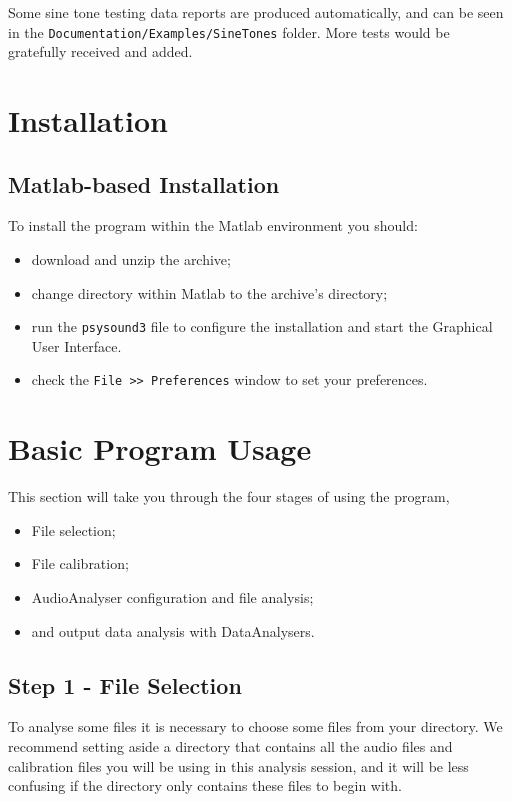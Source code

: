 \documentclass{article}
\begin{document}
Some sine tone testing data reports are produced automatically, and can be seen in the \texttt{Documentation/Examples/SineTones} folder. More tests would be gratefully received and added.

\section{Installation}

\subsection{Matlab-based Installation}
To install the program within the Matlab environment you should: 

\begin{itemize} 
	\item download and unzip the archive; 
	\item change directory within Matlab to the archive's directory;
	\item run the \texttt{psysound3} file to configure the installation and start the Graphical User Interface.
	\item check the \texttt{File >> Preferences} window to set your preferences. 
\end{itemize}

\clearpage
\section{Basic Program Usage}

This section will take you through the four stages of using the program,
\begin{itemize}
	\item File selection; 
	\item File calibration; 
	\item AudioAnalyser configuration and file analysis;
	\item and output data analysis with DataAnalysers.
\end{itemize}

\subsection{Step 1 - File Selection}

To analyse some files it is necessary to choose some files from your directory. We recommend setting aside a directory that contains all the audio files and calibration files you will be using in this analysis session, and it will be less confusing if the directory only contains these files to begin with. 
\end{document}
